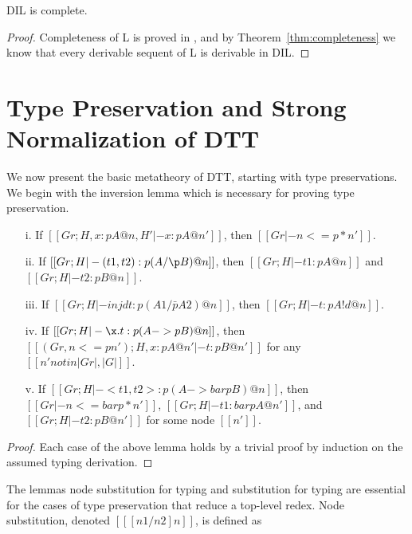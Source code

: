 \begin{corollary}[Completeness]
  \label{corollary:completeness}
  DIL is complete.
\end{corollary}
\begin{proof}
  Completeness of L is proved in \cite{Pinto:2009}, and by Theorem~\ref{thm:completeness} we know that
  every derivable sequent of L is derivable in DIL.
\end{proof}

\section{Type Preservation and Strong Normalization of DTT}
\label{sec:dualized_type_theory}
We now present the basic metatheory of DTT, starting with type
preservations. We begin with the inversion lemma which is necessary
for proving type preservation.
\begin{lemma}[Inverstion]
  \label{lemma:inverstion}
  \begin{itemize}
  \item[] 
  \item[i.] If $[[Gr;H, x : p A @ n, H' |- x : p A @ n']]$, then 
    $[[Gr |- n <=p* n']]$.
  \item[ii.] If $[[Gr;H |- (t1,t2) : p (A /\p B) @ n]]$, then 
    $[[Gr;H |- t1 : p A @ n]]$ and $[[Gr;H |- t2 : p B @ n]]$.
  \item[iii.] If $[[Gr;H |- inj d t : p (A1 /\bar p A2) @ n]]$, then 
    $[[Gr;H |- t : p A!d @ n]]$.
  \item[iv.] If $[[Gr;H |- \x.t : p (A ->p B)@n]]$, then 
    $[[(Gr, n <=p n');H,x : p A @ n' |- t : p B @ n']]$ for any
    $[[n' notin |Gr|,|G|]]$.
  \item[v.] If $[[Gr;H |- <t1,t2> : p (A ->bar p B) @ n]]$, then
    $[[Gr |- n <=bar p * n']]$, $[[Gr;H |- t1 : bar p A @ n']]$, and
    $[[Gr;H |- t2 : p B @ n']]$ for some node $[[n']]$.
  \end{itemize}
\end{lemma}
\begin{proof}
  Each case of the above lemma holds by a trivial proof by induction
  on the assumed typing derivation.
\end{proof}
\noindent The lemmas node substitution for typing and substitution for
typing are essential for the cases of type preservation that reduce a
top-level redex. Node substitution, denoted $[[ [n1/n2]n]]$, is defined as
